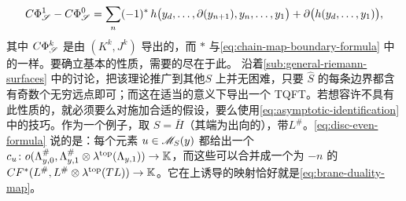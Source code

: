 \begin{equation}\label{eq:chain-homotopy-formula}
C\Phi^1_{\mathscr{S}}-C\Phi^0_{\mathscr{S}}
=\sum_n(-1)^*\,h\bigl(y_d,\ldots,\partial(y_{n+1}),y_n,\ldots,y_1\bigr)
+\partial\bigl(h(y_d,\ldots,y_1)\bigr),
\end{equation}
其中 $C\Phi^k_{\mathscr{S}}$ 是由 $(K^k,J^k)$ 导出的\trChainMap，而 $*$ 与\eqref{eq:chain-map-boundary-formula} 中的一样。要确立基本的\trWellDefinedness{}性质，需要的尽在于此。
沿着\cref{sub:general-riemann-surfaces} 中的讨论，把该理论推广到其他\trSurface{}$S$ 上并无困难，只要 $\hat{S}$ 的每条边界\trCircle{}都含有奇数个无穷远点即可；而这在适当的意义下导出一个 TQFT。若想容许不具有此性质的\trSurface，就必须要么对\trBrane{}施加合适的\trOrientation{}假设，要么使用\eqref{eq:asymptotic-identification} 中的技巧。作为一个例子，取 $S=\bar{H}$（其端为出向的），带\trBrane\trLabel{}$L^{\#}$。\eqref{eq:disc-even-formula} 说的是：每个\trIsolated{}元素 $u\in\mathscr{M}_{S}(y)$ 都给出一个\trIsomorphism{}$c_u\colon o(\Lambda^{\#}_{y,0},\Lambda^{\#}_{y,1}\otimes\lambda^{\mathrm{top}}(\Lambda_{y,1}))\to\mathbb{K}$，而这些可以合并成一个\trDegree{}为 $-n$ 的\trChainMap{}$CF^*(L^{\#},L^{\#}\otimes\lambda^{\mathrm{top}}(TL))\to\mathbb{K}$。它在\trCohomology{}上诱导的映射恰好就是\eqref{eq:brane-duality-map}。
